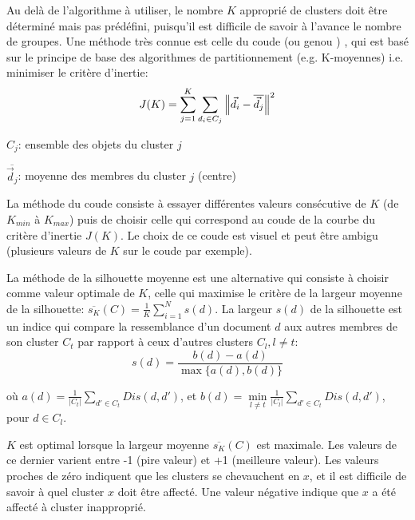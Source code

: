  Au delà de l’algorithme à utiliser, le nombre $K$ approprié de clusters doit être déterminé mais pas prédéfini, puisqu'il est difficile de savoir à l'avance le nombre de groupes. Une méthode très connue est celle du \og coude \fg{}  (ou \og genou \fg{}) \citep{halkidi2001clustvalidation}, qui est basé sur le principe de base des algorithmes de partitionnement (e.g. K-moyennes) i.e. minimiser le critère d'inertie:
\[J(K) = \sum\limits_{j=1}^K\sum\limits_{d_i \in C_j}\left\lVert\vec{d}_i-\overline{\vec{d}_j}\right\rVert^2\]

$C_j$: ensemble des objets du cluster $j$

$\overline{\vec{d}_j}$: moyenne des membres du cluster $j$ (centre)

La méthode du coude consiste à essayer différentes valeurs consécutive de $K$ (de $K_{min}$ à $K_{max}$) puis de choisir celle qui correspond au coude de la courbe du critère d'inertie $J(K)$. Le choix de ce coude est visuel et peut être ambigu (plusieurs valeurs de $K$ sur le coude par exemple). 

La méthode de la silhouette moyenne \citep{rousseeuw1987silhouetteclusternumber} est une alternative qui consiste à choisir comme valeur optimale de $K$, celle qui maximise le critère de la largeur moyenne de la silhouette: $\overline{s_K}(C) = \frac{1}{K}\sum\limits_{i=1}^N s(d)$. La largeur $s(d)$ de la silhouette est un indice qui compare la ressemblance d'un document $d$ aux autres membres de son cluster $C_t$ par rapport à ceux d'autres clusters $C_l, l \neq t$:
\[s(d) = \frac{b(d) - a(d)}{\max\lbrace a(d),b(d)\rbrace}\]

où $a(d) = \frac{1}{\vert C_t \vert} \sum\limits_{d' \in C_t} Dis(d, d')$, et $b(d) = \min\limits_{l \neq t} \frac{1}{\vert C_l \vert} \sum\limits_{d' \in C_t} Dis(d, d')$, pour $d \in C_l$.

$K$ est optimal lorsque la largeur moyenne $\overline{s_K}(C)$ est maximale. Les valeurs de ce dernier varient entre -1 (pire valeur) et +1 (meilleure valeur). Les valeurs proches de zéro indiquent que les clusters se chevauchent en $x$, et il est difficile de savoir à quel cluster $x$ doit être affecté. Une valeur négative indique que $x$ a été affecté à cluster inapproprié.



